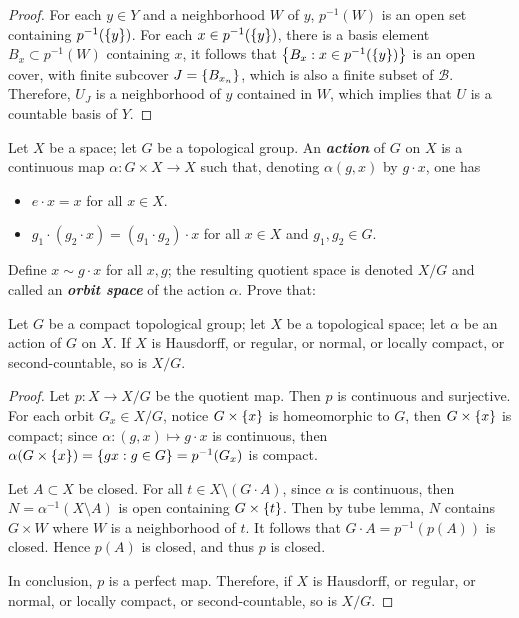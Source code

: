 \documentclass[12pt,a4paper]{article}
\begin{document}
\begin{ex}
\begin{itemize}
\begin{proof}
                For each $y\in Y$ and a neighborhood $W$ of $y$, $p^{-1}(W)$ is an open set containing $p^{-1}(\left\{y\right\})$. For each $x\in p^{-1}(\left\{y\right\})$, there is a basis element $B_x\subset p^{-1}(W)$ containing $x$, it follows that $\left\{B_x:x\in p^{-1}(\left\{y\right\})\right\}$ is an open cover, with finite subcover $J=\left\{B_{x_n}\right\}$, which is also a finite subset of $\mathcal{B}$. Therefore, $U_J$ is a neighborhood of $y$ contained in $W$, which implies that $U$ is a countable basis of $Y$.
            \end{proof}
        \end{itemize}
    \end{ex}
    \hfill

    \begin{ex}
        Let $X$ be a space; let $G$ be a topological group. An \textbf{\textit{action}} of $G$ on $X$ is a continuous map $\alpha:G\times X\to X$ such that, denoting $\alpha(g,x)$ by $g\cdot x$, one has
        \begin{itemize}
            \item $e\cdot x=x$ for all $x\in X$.
            \item $g_1\cdot(g_2\cdot x)=(g_1\cdot g_2)\cdot x$ for all $x\in X$ and $g_1,g_2\in G$.
        \end{itemize}
        Define $x\sim g\cdot x$ for all $x,g$; the resulting quotient space is denoted $X/G$ and called an \textbf{\textit{orbit space}} of the action $\alpha$. Prove that:

        Let $G$ be a compact topological group; let $X$ be a topological space; let $\alpha$ be an action of $G$ on $X$. If $X$ is Hausdorff, or regular, or normal, or locally compact, or second-countable, so is $X/G$.
    \end{ex}
    \begin{proof}
        Let $p:X\to X/G$ be the quotient map. Then $p$ is continuous and surjective. For each orbit $G_x\in X/G$, notice $G\times\left\{x\right\}$ is homeomorphic to $G$, then $G\times\left\{x\right\}$ is compact; since $\alpha:(g,x)\mapsto g\cdot x$ is continuous, then $\alpha(G\times\left\{x\right\})=\left\{gx:g\in G\right\}=p^{-1}(G_x)$ is compact.

        Let $A\subset X$ be closed. For all $t\in X\setminus (G\cdot A)$, since $\alpha$ is continuous, then $N=\alpha^{-1}(X\setminus A)$ is open containing $G\times \left\{t\right\}$. Then by tube lemma, $N$ contains $G\times W$ where $W$ is a neighborhood of $t$. It follows that $G\cdot A=p^{-1}(p(A))$ is closed. Hence $p(A)$ is closed, and thus $p$ is closed.

        In conclusion, $p$ is a perfect map. Therefore, if $X$ is Hausdorff, or regular, or normal, or locally compact, or second-countable, so is $X/G$.
    \end{proof}
    \hfill
\end{document}

